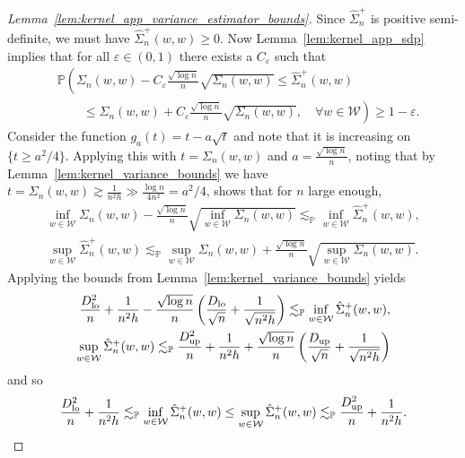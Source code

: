 \documentclass[11pt,lof]{puthesis}
\renewcommand{\P}{\ensuremath{\mathbb{P}}}
\newcommand{\cW}{\ensuremath{\mathcal{W}}}
\newcommand{\Dl}{\ensuremath{D_{\textup{lo}}}}
\newcommand{\Du}{\ensuremath{D_{\textup{up}}}}
\theoremstyle{break}
\theoremstyle{proof}
\newtheorem{proof}{Proof}
\begin{document}
\begin{proof}[Lemma~\ref{lem:kernel_app_variance_estimator_bounds}]

  Since $\hat \Sigma_n^+$ is positive semi-definite,
  we must have $\hat \Sigma_n^+(w,w) \geq 0$.
  Now Lemma~\ref{lem:kernel_app_sdp}
  implies that for all $\varepsilon \in (0,1)$
  there exists a $C_\varepsilon$ such that
  \begin{align*}
    &\P\left(
      \Sigma_n(w,w) - C_\varepsilon \frac{\sqrt{\log n}}{n} \sqrt{\Sigma_n(w,w)}
      \leq
      \hat \Sigma_n^+(w,w)
      \right.
      \\
      &\left.
      \qquad\leq
      \Sigma_n(w,w) + C_\varepsilon \frac{\sqrt{\log n}}{n}
      \sqrt{\Sigma_n(w,w)},
      \quad \forall w \in \cW
    \right)
    \geq 1-\varepsilon.
  \end{align*}
  Consider the function
  $g_a(t) = t - a \sqrt{t}$
  and note that it is increasing on $\{t \geq a^2/4\}$.
  Applying this with $t = \Sigma_n(w,w)$
  and $a = \frac{\sqrt{\log n}}{n}$,
  noting that by Lemma~\ref{lem:kernel_variance_bounds} we have
  $t = \Sigma_n(w,w) \gtrsim \frac{1}{n^2h}
  \gg \frac{\log n}{4n^2} = a^2/4$,
  shows that for $n$ large enough,
  \begin{align*}
    \inf_{w \in \cW} \Sigma_n(w,w)
    - \frac{\sqrt{\log n}}{n} \sqrt{\inf_{w \in \cW} \Sigma_n(w,w)}
    \lesssim_\P
    \inf_{w \in \cW}\hat \Sigma_n^+(w,w), \\
    \sup_{w \in \cW}\hat \Sigma_n^+(w,w)
    \lesssim_\P
    \sup_{w \in \cW} \Sigma_n(w,w)
    + \frac{\sqrt{\log n}}{n} \sqrt{\sup_{w \in \cW} \Sigma_n(w,w)}.
  \end{align*}
  Applying the bounds from Lemma~\ref{lem:kernel_variance_bounds}
  yields
  \begin{align*}
    \frac{\Dl^2}{n} + \frac{1}{n^2h}
    - \frac{\sqrt{\log n}}{n}
    \left( \frac{\Dl}{\sqrt n} + \frac{1}{\sqrt{n^2h}} \right)
    \lesssim_\P
    \inf_{w \in \cW}\hat \Sigma_n^+(w,w), \\
    \sup_{w \in \cW}\hat \Sigma_n^+(w,w)
    \lesssim_\P
    \frac{\Du^2}{n} + \frac{1}{n^2h}
    + \frac{\sqrt{\log n}}{n}
    \left( \frac{\Du}{\sqrt n} + \frac{1}{\sqrt{n^2h}} \right)
  \end{align*}
  and so
  \begin{align*}
    \frac{\Dl^2}{n} + \frac{1}{n^2h}
    \lesssim_\P
    \inf_{w \in \cW}\hat \Sigma_n^+(w,w)
    \leq
    \sup_{w \in \cW}\hat \Sigma_n^+(w,w)
    \lesssim_\P
    \frac{\Du^2}{n} + \frac{1}{n^2h}.
  \end{align*}
\end{proof}
\end{document}
